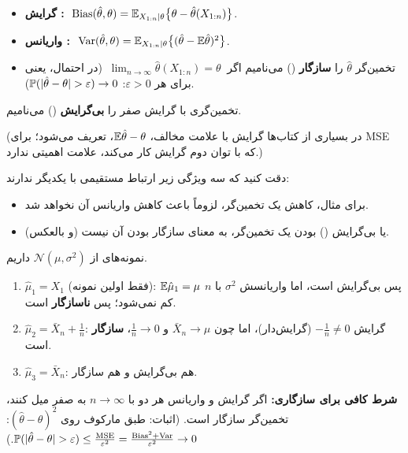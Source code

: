 \begin{definition}
\begin{itemize}
\item \textbf{گرایش :}
$\ \mathrm{Bias}(\hat\theta,\theta)=\E_{X_{1:n}|\theta}\big\{\theta-\hat\theta(X_{1:n})\big\}$.
\item \textbf{واریانس :}
$\ \Var(\hat\theta,\theta)=\E_{X_{1:n}|\theta}\big\{(\hat\theta-\E\hat\theta)^2\big\}$.
\item تخمین‌گر $\hat\theta$ را \textbf{سازگار} () می‌نامیم اگر $\ \lim_{n\to\infty}\hat\theta(X_{1:n})=\theta\ $ (در احتمال، یعنی برای هر $\varepsilon>0$: $\Prob(|\hat\theta-\theta|>\varepsilon)\to0$).
\end{itemize}
تخمین‌گری با گرایش صفر را \textbf{بی‌گرایش} () می‌نامیم.
\end{definition}
(در بسیاری از کتاب‌ها گرایش با علامت مخالف، $\mathbb{E}\hat\theta-\theta$، تعریف می‌شود؛ برای MSE که با توان دوم گرایش کار می‌کند، علامت اهمیتی ندارد.)

\begin{note}
\notetitle دقت کنید که سه ویژگی زیر ارتباط مستقیمی با یکدیگر ندارند:
\begin{itemize}
\item برای مثال، کاهش  یک تخمین‌گر، لزوماً باعث کاهش واریانس آن نخواهد شد.
\item یا بی‌گرایش () بودن یک تخمین‌گر، به معنای سازگار بودن آن نیست (و بالعکس).
\end{itemize}
\end{note}

\begin{example}
نمونه‌های  از $\mathcal N(\mu,\sigma^2)$ داریم.
\begin{enumerate}
\item $\hat\mu_1=X_1$ (فقط اولین نمونه): $\mathbb{E}\hat\mu_1=\mu$ پس بی‌گرایش است، اما واریانسش $\sigma^2$ با $n$ کم نمی‌شود؛ پس \textbf{ناسازگار} است.
\item $\hat\mu_2=\bar X_n+\frac1n$: گرایش $-\frac1n\ne0$ (گرایش‌دار)، اما چون $\bar X_n\to\mu$ و $\frac1n\to0$، \textbf{سازگار} است.
\item $\hat\mu_3=\bar X_n$: هم بی‌گرایش و هم سازگار.
\end{enumerate}
\end{example}

\begin{note}
\notetitle \textbf{شرط کافی برای سازگاری:} اگر گرایش و واریانس هر دو با $n\to\infty$ به صفر میل کنند، تخمین‌گر سازگار است. (اثبات: طبق مارکوف روی $(\hat\theta-\theta)^2$: $\Prob(|\hat\theta-\theta|>\varepsilon)\le\frac{\mathrm{MSE}}{\varepsilon^2}=\frac{\mathrm{Bias}^2+\Var}{\varepsilon^2}\to0$.)
\end{note}

